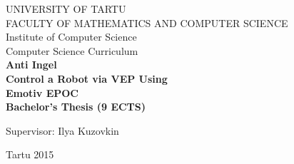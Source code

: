 
\begin{center}
\thispagestyle{empty}
\large{UNIVERSITY OF TARTU}\\
\large{FACULTY OF MATHEMATICS AND COMPUTER SCIENCE}\\
\large{Institute of Computer Science}\\
\large{Computer Science Curriculum}\\
\vspace{160pt}
\Large{\bf Anti Ingel}\\
\vspace{6pt}
\LARGE{\textbf{Control a Robot via VEP Using \\Emotiv EPOC}}\\
\vspace{12pt}
\large{\bf Bachelor's Thesis (9 ECTS)}
\vspace{63pt}
\end{center}
\hfill \Large{Supervisor: Ilya Kuzovkin}
\vfill
\begin{center}
\large{Tartu 2015}
\end{center}
